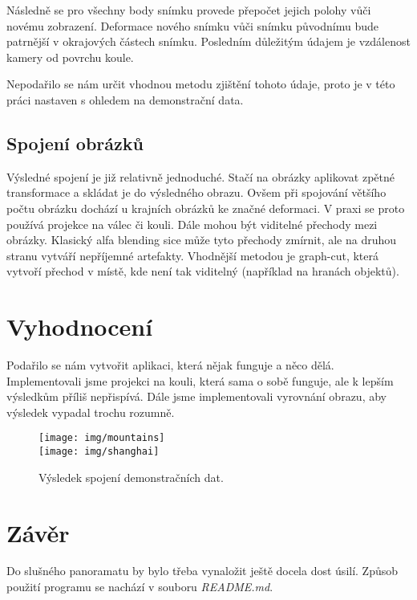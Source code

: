 \documentclass[12pt,a4paper,titlepage,final]{article}
\begin{document}
Následně se pro všechny body
snímku provede přepočet jejich polohy vůči novému zobrazení. Deformace nového
snímku vůči snímku původnímu bude patrnější v okrajových částech snímku.
Posledním důležitým údajem je vzdálenost kamery od povrchu koule.

Nepodařilo se
nám určit vhodnou metodu zjištění tohoto údaje, proto je v této práci nastaven
s ohledem na demonstrační data.

\subsection{Spojení obrázků}

Výsledné spojení je již relativně jednoduché. Stačí na obrázky aplikovat zpětné
transformace a skládat je do výsledného obrazu.
Ovšem při spojování většího počtu obrázku dochází u krajních obrázků ke značné
deformaci. V praxi se proto používá projekce na válec či kouli.
Dále mohou být viditelné přechody mezi obrázky. Klasický alfa blending
sice může tyto přechody zmírnit, ale na druhou stranu vytváří nepříjemné
artefakty. Vhodnější metodou je graph-cut, která vytvoří přechod v místě, kde
není tak viditelný (například na hranách objektů).

\section{Vyhodnocení}

Podařilo se nám vytvořit aplikaci, která nějak funguje a něco dělá.
Implementovali jsme projekci na kouli, která sama o sobě funguje, ale k lepším
výsledkům příliš nepřispívá. Dále jsme implementovali vyrovnání obrazu, aby 
výsledek vypadal trochu rozumně.

\begin{figure}[H!]
    \center
    \texttt{[image: img/mountains]} \\
    \vspace{0.7cm}
    \texttt{[image: img/shanghai]} \\
    \caption{Výsledek spojení demonstračních dat.}
\end{figure}

\section{Závěr}

Do slušného panoramatu by bylo třeba vynaložit ještě docela dost úsilí.
Způsob použití programu se nachází v souboru \textit{README.md}.


%
%

\end{document}
